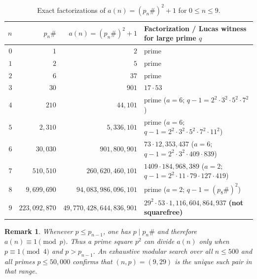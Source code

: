 \documentclass[11pt]{article}
\newtheorem{remark}{Remark}
\begin{document}
\begin{table}[h]
\centering
\footnotesize
\setlength{\tabcolsep}{4pt}
\begin{tabular}{@{}rrrl@{}}
\toprule
$n$ & $p_n\#$ & $a(n) = (p_n\#)^2 + 1$ & Factorization / Lucas witness for large prime $q$ \\
\midrule
$0$ & $1$ & $2$ & prime \\
$1$ & $2$ & $5$ & prime \\
$2$ & $6$ & $37$ & prime \\
$3$ & $30$ & $901$ & $17 \cdot 53$ \\
$4$ & $210$ & $44{,}101$ & prime ($a=6$; $q{-}1 = 2^2{\cdot}3^2{\cdot}5^2{\cdot}7^2$) \\
$5$ & $2{,}310$ & $5{,}336{,}101$ & prime ($a=6$; $q{-}1 = 2^2{\cdot}3^2{\cdot}5^2{\cdot}7^2{\cdot}11^2$) \\
$6$ & $30{,}030$ & $901{,}800{,}901$ & $73 \cdot 12{,}353{,}437$ ($a=6$; $q{-}1 = 2^2{\cdot}3^2{\cdot}409{\cdot}839$) \\
$7$ & $510{,}510$ & $260{,}620{,}460{,}101$ & $1409 \cdot 184{,}968{,}389$ ($a=2$; $q{-}1 = 2^2{\cdot}11{\cdot}79{\cdot}127{\cdot}419$) \\
$8$ & $9{,}699{,}690$ & $94{,}083{,}986{,}096{,}101$ & prime ($a=2$; $q{-}1 = (p_8\#)^2$) \\
$9$ & $223{,}092{,}870$ & $49{,}770{,}428{,}644{,}836{,}901$ & $29^2 \cdot 53 \cdot 1{,}116{,}604{,}864{,}937$ \textbf{(not squarefree)} \\
\bottomrule
\end{tabular}
\caption{Exact factorizations of $a(n) = (p_n\#)^2 + 1$ for $0 \le n \le 9$.}
\label{tab:min}
\end{table}

\begin{remark}
Whenever $p \le p_{n-1}$, one has $p \mid p_n\#$ and therefore $a(n) \equiv 1 \pmod p$. Thus a prime square $p^2$ can divide $a(n)$ only when $p \equiv 1 \pmod 4$ and $p > p_{n-1}$. An exhaustive modular search over all $n \le 500$ and all primes $p \le 50{,}000$ confirms that $(n, p) = (9, 29)$ is the unique such pair in that range.
\end{remark}
\end{document}
